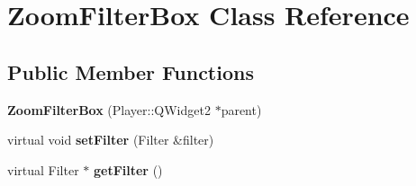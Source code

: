 \hypertarget{classZoomFilterBox}{}\section{Zoom\+Filter\+Box Class Reference}
\label{classZoomFilterBox}
\subsection*{Public Member Functions}
\begin{DoxyCompactItemize}
\item 
\hypertarget{classZoomFilterBox_a91636ad92dd9271ebba7079bbe1aacdd}{}{\bfseries Zoom\+Filter\+Box} (Player\+::\+Q\+Widget2 $\ast$parent)\label{classZoomFilterBox_a91636ad92dd9271ebba7079bbe1aacdd}

\item 
\hypertarget{classZoomFilterBox_a09e99b0db09b8468ce7d7e0f98293ac5}{}virtual void {\bfseries set\+Filter} (Filter \&filter)\label{classZoomFilterBox_a09e99b0db09b8468ce7d7e0f98293ac5}

\item 
\hypertarget{classZoomFilterBox_ad7b14770615490d1445c958c79fd3adb}{}virtual Filter $\ast$ {\bfseries get\+Filter} ()\label{classZoomFilterBox_ad7b14770615490d1445c958c79fd3adb}

\end{DoxyCompactItemize}
